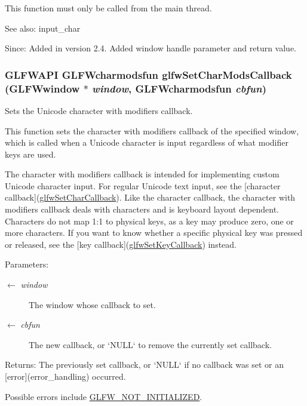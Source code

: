This function must only be called from the main thread.

\begin{Desc}
\item[See also:]input\_\-char\end{Desc}
\begin{Desc}
\item[Since:]Added in version 2.4.  Added window handle parameter and return value. \end{Desc}
\hypertarget{group__input_ge6eee0bda7429bfe8028615847cf6795}{
\subsubsection[glfwSetCharModsCallback]{\setlength{\rightskip}{0pt plus 5cm}GLFWAPI {\bf GLFWcharmodsfun} glfwSetCharModsCallback ({\bf GLFWwindow} $\ast$ {\em window}, \/  {\bf GLFWcharmodsfun} {\em cbfun})}}
\label{group__input_ge6eee0bda7429bfe8028615847cf6795}


Sets the Unicode character with modifiers callback. 

This function sets the character with modifiers callback of the specified window, which is called when a Unicode character is input regardless of what modifier keys are used.

The character with modifiers callback is intended for implementing custom Unicode character input. For regular Unicode text input, see the \mbox{[}character callback\mbox{]}(\hyperlink{group__input_g07b2959b23dc3e466ce7475746021002}{glfwSetCharCallback}). Like the character callback, the character with modifiers callback deals with characters and is keyboard layout dependent. Characters do not map 1:1 to physical keys, as a key may produce zero, one or more characters. If you want to know whether a specific physical key was pressed or released, see the \mbox{[}key callback\mbox{]}(\hyperlink{group__input_ga73bb92f628a2a0be9c132d56f19362c}{glfwSetKeyCallback}) instead.

\begin{Desc}
\item[Parameters:]
\begin{description}
\item[\mbox{$\leftarrow$} {\em window}]The window whose callback to set. \item[\mbox{$\leftarrow$} {\em cbfun}]The new callback, or `NULL` to remove the currently set callback. \end{description}
\end{Desc}
\begin{Desc}
\item[Returns:]The previously set callback, or `NULL` if no callback was set or an \mbox{[}error\mbox{]}(error\_\-handling) occurred.\end{Desc}
Possible errors include \hyperlink{group__errors_g2374ee02c177f12e1fa76ff3ed15e14a}{GLFW\_\-NOT\_\-INITIALIZED}.

